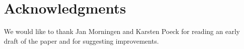 \section{Acknowledgments}

We would like to thank Jan Morningen and Karsten Poeck for reading an
early draft of the paper and for suggesting improvements.
